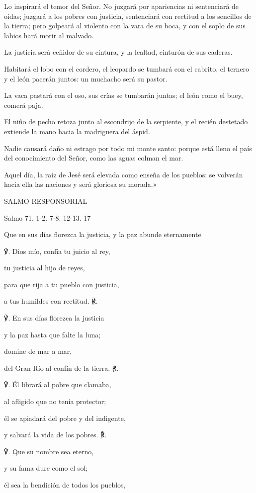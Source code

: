 \documentclass[]{article}
\begin{document}
Lo inspirará el temor del Señor. No juzgará por apariencias ni
sentenciará de oídas; juzgará a los pobres con justicia, sentenciará con
rectitud a los sencillos de la tierra; pero golpeará al violento con la
vara de su boca, y con el soplo de sus labios hará morir al malvado.

La justicia será ceñidor de su cintura, y la lealtad, cinturón de sus
caderas.

Habitará el lobo con el cordero, el leopardo se tumbará con el cabrito,
el ternero y el león pacerán juntos: un muchacho será su pastor.

La vaca pastará con el oso, sus crías se tumbarán juntas; el león como
el buey, comerá paja.

El niño de pecho retoza junto al escondrijo de la serpiente, y el recién
destetado extiende la mano hacia la madriguera del áspid.

Nadie causará daño ni estrago por todo mi monte santo: porque está lleno
el país del conocimiento del Señor, como las aguas colman el mar.

Aquel día, la raíz de Jesé será elevada como enseña de los pueblos: se
volverán hacia ella las naciones y será gloriosa su morada.»

SALMO RESPONSORIAL

Salmo 71, 1-2. 7-8. 12-13. 17

Que en sus días florezca la justicia, y la paz abunde eternamente

℣. Dios mío, confía tu juicio al rey,

tu justicia al hijo de reyes,

para que rija a tu pueblo con justicia,

a tus humildes con rectitud. ℟.

℣. En sus días florezca la justicia

y la paz hasta que falte la luna;

domine de mar a mar,

del Gran Río al confín de la tierra. ℟.

℣. Él librará al pobre que clamaba,

al afligido que no tenía protector;

él se apiadará del pobre y del indigente,

y salvará la vida de los pobres. ℟.

℣. Que su nombre sea eterno,

y su fama dure como el sol;

él sea la bendición de todos los pueblos,
\end{document}
